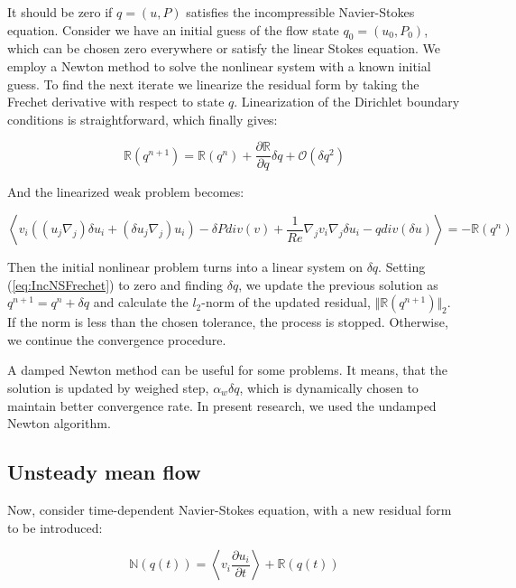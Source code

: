 It should be zero if $q = (u,P)$ satisfies the incompressible Navier-Stokes equation. Consider we have an initial guess of the flow state $q_0 = (u_0, P_0)$, which can be chosen zero everywhere or satisfy the linear Stokes equation. We employ a Newton method to solve the nonlinear system with a known initial guess. To find the next iterate we linearize the residual form by taking the Frechet derivative with respect to state $q$. Linearization of the Dirichlet boundary conditions is straightforward, which finally gives:

\begin{equation}
\label{eq:IncNSFrechet}
\mathbb{R}(q^{n+1}) = \mathbb{R}(q^n) + \frac{\partial \mathbb{R}}{\partial q} \delta q + \mathcal{O}(\delta q^2)
\end{equation}

And the linearized weak problem becomes:

\begin{equation}
\left<v_i \left( (u_j \nabla_j) \delta u_i + (\delta  u_j \nabla_j) u_i \right) - \delta  P div(v) + \frac{1}{Re}\nabla_j v_i \nabla_j \delta  u_i - q div(\delta u)\right> = - \mathbb{R}(q^n) 
\end{equation}

Then the initial nonlinear problem turns into a linear system on $\delta q$. Setting (\ref{eq:IncNSFrechet}) to zero and finding $\delta q$, we update the previous solution as $q^{n+1} = q^n + \delta q$ and calculate the $l_2$-norm of the updated residual, $\Vert \mathbb{R}(q^{n+1}) \Vert _2$. If the norm is less than the chosen tolerance, the process is stopped. Otherwise, we continue the convergence procedure.

A damped Newton method can be useful for some problems. It means, that the solution is updated by weighed step, $\alpha_w \delta q$, which is dynamically chosen to maintain better convergence rate. In present research, we used the undamped Newton algorithm.

\subsection{Unsteady mean flow}

Now, consider time-dependent Navier-Stokes equation, with a new residual form to be introduced:

\begin{equation}
    \mathbb{N}(q(t)) = \left< v_i \frac{\partial u_i}{\partial t} \right> + \mathbb{R}(q(t))
\end{equation}

